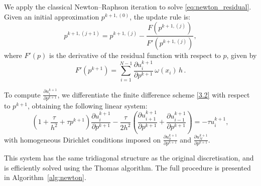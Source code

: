 \documentclass[reqno]{amsart}
\begin{document}
We apply the classical Newton–Raphson iteration to solve \eqref{eq:newton_residual}. Given an initial approximation \( p^{k+1,(0)} \), the update rule is:
\begin{equation} \label{eq:newton_update}
p^{k+1,(j+1)} = p^{k+1,(j)} - \frac{F(p^{k+1,(j)})}{F'(p^{k+1,(j)})},
\end{equation}
where \( F'(p) \) is the derivative of the residual function with respect to \( p \), given by
\begin{equation} \label{eq:dfdp}
F'(p^{k+1}) = \sum_{i=1}^{N-1} \frac{\partial u_i^{k+1}}{\partial p^{k+1}} \, \omega(x_i)\, h \, .
\end{equation}

To compute \( \frac{\partial u_i^{k+1}}{\partial p^{k+1}} \), we differentiate the finite difference scheme \eqref{3.2} with respect to \( p^{k+1} \), obtaining the following linear system:
\begin{equation} \label{eq:du_dp_system}
\left( 1 + \frac{\tau}{h^2} + \tau p^{k+1} \right) \frac{\partial u_i^{k+1}}{\partial p^{k+1}} - \frac{\tau}{2h^2} \left( \frac{\partial u_{i+1}^{k+1}}{\partial p^{k+1}} + \frac{\partial u_{i-1}^{k+1}}{\partial p^{k+1}} \right)
= -\tau u_i^{k+1},
\end{equation}
with homogeneous Dirichlet conditions imposed on \( \frac{\partial u_0^{k+1}}{\partial p^{k+1}} \) and \( \frac{\partial u_N^{k+1}}{\partial p^{k+1}} \).

This system has the same tridiagonal structure as the original discretisation, and is efficiently solved using the Thomas algorithm. The full procedure is presented in Algorithm~\ref{alg:newton}.
\end{document}

